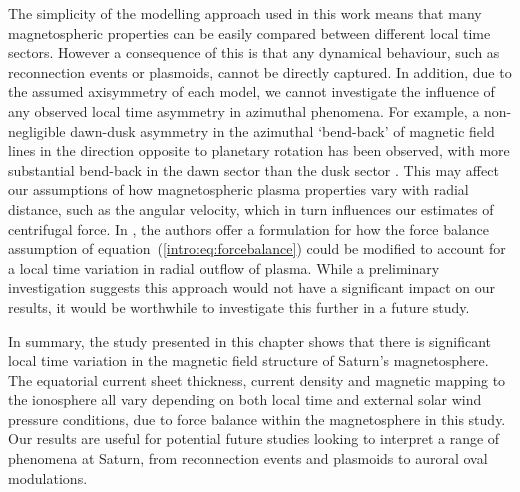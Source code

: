 The simplicity of the modelling approach used in this work means that many magnetospheric properties can be easily compared between different local time sectors. However a consequence of this is that any dynamical behaviour, such as reconnection events or plasmoids, cannot be directly captured. In addition, due to the assumed axisymmetry of each model, we cannot investigate the influence of any observed local time asymmetry in azimuthal phenomena. For example, a non-negligible dawn-dusk asymmetry in the azimuthal `bend-back' of magnetic field lines in the direction opposite to planetary rotation has been observed, with more substantial bend-back in the dawn sector than the dusk sector \citep[e.g.][]{delamere2015}. This may affect our assumptions of how magnetospheric plasma properties vary with radial distance, such as the angular velocity, which in turn influences our estimates of centrifugal force. In \citet{jia2016}, the authors offer a formulation for how the force balance assumption of equation~(\ref{intro:eq:forcebalance}) could be modified to account for a local time variation in radial outflow of plasma. While a preliminary investigation suggests this approach would not have a significant impact on our results, it would be worthwhile to investigate this further in a future study.

In summary, the study presented in this chapter shows that there is significant local time variation in the magnetic field structure of Saturn's magnetosphere. The equatorial current sheet thickness, current density and magnetic mapping to the ionosphere all vary depending on both local time and external solar wind pressure conditions, due to force balance within the magnetosphere in this study. Our results are useful for potential future studies looking to interpret a range of phenomena at Saturn, from reconnection events and plasmoids to auroral oval modulations. 